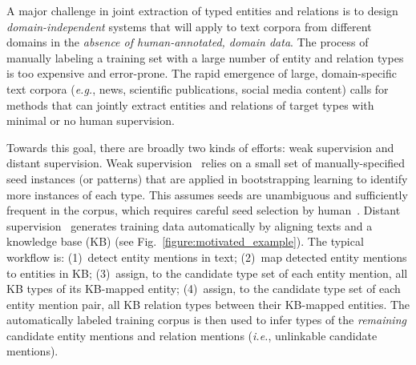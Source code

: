 \documentclass[letterpaper]{sig-alternate-2013}
\def\ie{{\sl i.e.}}
\def\eg{{\sl e.g.}}
\begin{document}
A major challenge in joint extraction of typed entities and relations is to design \textit{domain-independent} systems that will apply to text corpora from different domains in the \textit{absence of human-annotated, domain data}. The process of manually labeling a training set with a large number of entity and relation types is too expensive and error-prone. The rapid emergence of large, domain-specific text corpora (\eg, news, scientific publications, social media content) calls for methods that can jointly extract entities and relations of target types with minimal or no human supervision. 

Towards this goal, there are broadly two kinds of efforts: weak supervision and distant supervision. Weak supervision~\cite{bunescu2007learning,nakashole2013fine,etzioni2004web} relies on a small set of manually-specified seed instances (or patterns) that are applied in bootstrapping learning to identify more instances of each type. This assumes seeds are unambiguous and sufficiently frequent in the corpus, which requires careful seed selection by human~\cite{bach2007review}. Distant supervision~\cite{mintz2009distant,riedel2010modeling,
hoffmann2011multiR,surdeanu2012MIME} generates training data automatically by aligning texts and a knowledge base (KB) (see Fig.~\ref{figure:motivated_example}). The typical workflow is: (1)~detect entity mentions in text; (2)~map detected entity mentions to entities in KB; (3)~assign, to the candidate type set of each entity mention, all KB types of its KB-mapped entity; (4)~assign, to the candidate type set of each entity mention pair, all KB relation types between their KB-mapped entities. The automatically labeled training corpus is then used to infer types of the \textit{remaining} candidate entity mentions and relation mentions (\ie, unlinkable candidate mentions).
\end{document}
